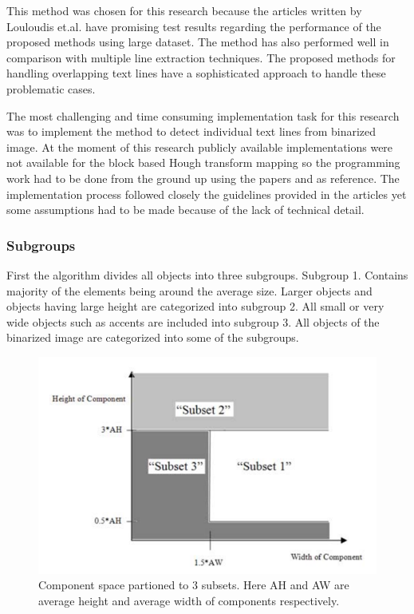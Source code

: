 \documentclass{article}
\begin{document}
          This method was chosen for this research because the articles written by Louloudis et.al. have promising test results regarding the performance of the proposed methods using large dataset. The method has also performed well in comparison with multiple line extraction techniques.\cite{Razak} The proposed methods for handling overlapping text lines have a sophisticated approach to handle these problematic cases.

          The most challenging and time consuming implementation task for this research was to implement the method to detect individual text lines from binarized image. At the moment of this research publicly available implementations were not available for the block based Hough transform mapping so the programming work had to be done from the ground up using the papers \cite{Louloudis1} and \cite{Louloudis2} as reference. The implementation process followed closely the guidelines provided in the articles yet some assumptions had to be made because of the lack of technical detail.

          \subsubsection{Subgroups}
            First the algorithm divides all objects into three subgroups. Subgroup 1. Contains majority of the elements being around the average size. Larger objects and objects having large height are categorized into subgroup 2. All small or very wide objects such as accents are included into subgroup 3. All objects of the binarized image are categorized into some of the subgroups.

            \begin{figure}[!ht]
              \centering
              \includegraphics[natwidth=649, natheight=416, scale = 0.4]{subgroups.png}
              \caption{Component space partioned to 3 subsets. Here AH and AW are average height and average width of components respectively.\cite{Louloudis1} \label{fig:subgroupspace}}
            \end{figure}
\end{document}
